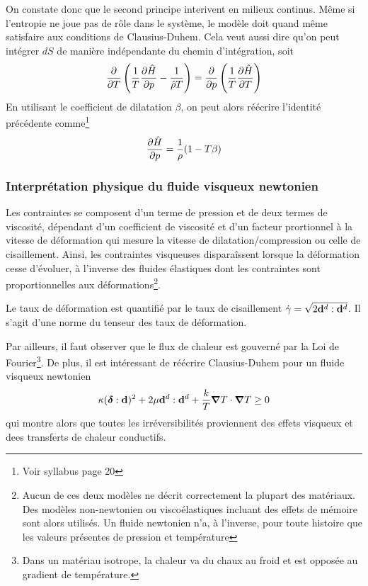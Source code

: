 \documentclass[a4paper,11pt]{report}
\newcommand{\bs}[1]{\boldsymbol{#1}}
\newcommand{\recip}[1]{\frac{1}{#1}}
\begin{document}
      On constate donc que le second principe interivent en milieux continus. Même si l'entropie ne joue pas de rôle dans le système, le modèle doit quand même satisfaire aux conditions de Clausius-Duhem. Cela veut aussi dire qu'on peut intégrer $dS$ de manière indépendante du chemin d'intégration, soit
      \begin{equation}
        \pdv{}{T}\left(\recip{T}\pdv{\hat{H}}{p} - \recip{\hat{\rho}T}\right) = \pdv{}{p}\left(\recip{T}\pdv{\hat{H}}{T}\right)
      \end{equation}
      En utilisant le coefficient de dilatation $\beta$, on peut alors réécrire l'identité précédente comme\footnote{Voir syllabus page 20}
      \begin{equation}
        \pdv{\hat{H}}{p} = \recip{\rho}(1-T\beta)\label{eq:dHdpbeta}
      \end{equation}

      \subsubsection{Interprétation physique du fluide visqueux newtonien}
        Les contraintes se composent d'un terme de pression et de deux termes de viscosité, dépendant d'un coefficient de viscosité et d'un facteur prortionnel à la vitesse de déformation qui mesure la vitesse de dilatation/compression ou celle de cisaillement. Ainsi, les contraintes visqueuses disparaîssent lorsque la déformation cesse d'évoluer, à l'inverse des fluides élastiques dont les contraintes sont proportionnelles aux déformations\footnote{Aucun de ces deux modèles ne décrit correctement la plupart des matériaux. Des modèles non-newtonien ou viscoélastiques incluant des effets de mémoire sont alors utilisés. Un fluide newtonien n'a, à l'inverse, pour toute histoire que les valeurs présentes de pression et température}.

        Le taux de déformation est quantifié par le taux de cisaillement $\dot{\gamma} = \sqrt{2\vb{d}^d:\vb{d}^d}$. Il s'agit d'une norme du tenseur des taux de déformation.

        Par ailleurs, il faut observer que le flux de chaleur est gouverné par la Loi de Fourier\footnote{Dans un matériau isotrope, la chaleur va du chaux au froid et est opposée au gradient de température.}. De plus, il est intéressant de réécrire Clausius-Duhem pour un fluide visqueux newtonien
        \begin{equation}
          \kappa (\bs{\delta}:\vb{d})^2 + 2 \mu \vb{d}^d : \vb{d}^d + \frac{k}{T}\grad T \cdot \grad T \geq 0
        \end{equation}
        qui montre alors que toutes les irréversibilités proviennent des effets visqueux et dees transferts de chaleur conductifs.
\end{document}
